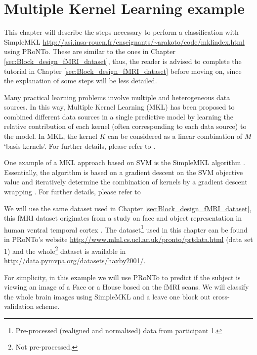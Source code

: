 
\chapter{Multiple Kernel Learning example}
\label{data_example3}
\minitoc


This chapter will describe the steps necessary to perform a classification with SimpleMKL \url{http://asi.insa-rouen.fr/enseignants/~arakoto/code/mklindex.html} \cite{Rakotomamonjy2008} using PRoNTo. These are similar to the ones in Chapter \ref{sec:Block_design_fMRI_dataset}, thus, the reader is advised to complete the tutorial in Chapter \ref{sec:Block_design_fMRI_dataset}  before moving on, since the explanation of some steps will be less detailed.

Many practical learning problems involve multiple and heterogeneous data sources. In this way, Multiple Kernel Learning (MKL) \cite{Bach2004} has been proposed to combined different data sources in a single predictive model by learning the relative contribution of each kernel (often corresponding to each data source) to the model. In MKL, the kernel $K$  can  be  considered  as  a  linear  combination  of $M$ `basis kernels'. For further details, please refer to \cite{Bach2004}.

One example of a MKL approach based on SVM is the SimpleMKL algorithm \cite{Rakotomamonjy2008}. Essentially, the algorithm is based on a gradient descent on the SVM objective value and iteratively determine the combination of kernels by a gradient descent wrapping \cite{Rakotomamonjy2008}. For further details, please refer to \cite{Rakotomamonjy2008}

We will use the same dataset used in Chapter \ref{sec:Block_design_fMRI_dataset}, this fMRI dataset originates from a study on face and object representation in human ventral temporal cortex \cite{Haxby2001}. The dataset\footnote{Pre-processed (realigned and normalised) data from participant 1.} used in this chapter can be found in PRoNTo's website \url{http://www.mlnl.cs.ucl.ac.uk/pronto/prtdata.html} (data set 1) and the whole\footnote{Not pre-processed.} dataset is available in \url{http://data.pymvpa.org/datasets/haxby2001/}.

For simplicity, in this example we will use PRoNTo to predict if the subject is viewing an image of a Face or a House based on the fMRI scans. We will classify the whole brain images using SimpleMKL and a leave one block out cross-validation scheme.

